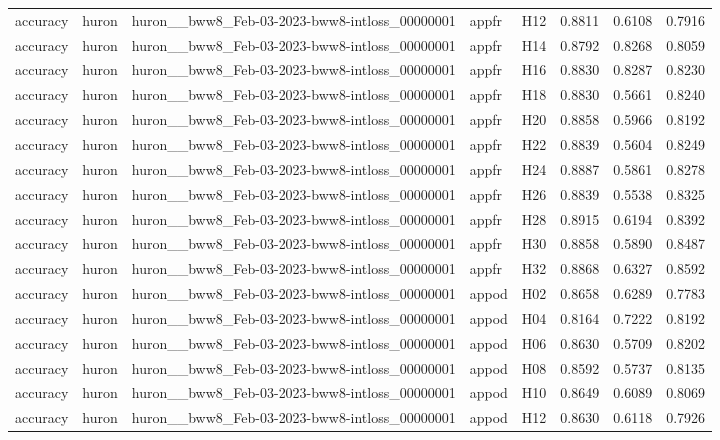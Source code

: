 \begin{table}[tbp]
\begin{tabular}{lllllrrr}
accuracy & huron & huron\_\_bww8\_Feb-03-2023-bww8-intloss\_00000001 & appfr & H12 & 0.8811 & 0.6108 & 0.7916 \\
accuracy & huron & huron\_\_bww8\_Feb-03-2023-bww8-intloss\_00000001 & appfr & H14 & 0.8792 & 0.8268 & 0.8059 \\
accuracy & huron & huron\_\_bww8\_Feb-03-2023-bww8-intloss\_00000001 & appfr & H16 & 0.8830 & 0.8287 & 0.8230 \\
accuracy & huron & huron\_\_bww8\_Feb-03-2023-bww8-intloss\_00000001 & appfr & H18 & 0.8830 & 0.5661 & 0.8240 \\
accuracy & huron & huron\_\_bww8\_Feb-03-2023-bww8-intloss\_00000001 & appfr & H20 & 0.8858 & 0.5966 & 0.8192 \\
accuracy & huron & huron\_\_bww8\_Feb-03-2023-bww8-intloss\_00000001 & appfr & H22 & 0.8839 & 0.5604 & 0.8249 \\
accuracy & huron & huron\_\_bww8\_Feb-03-2023-bww8-intloss\_00000001 & appfr & H24 & 0.8887 & 0.5861 & 0.8278 \\
accuracy & huron & huron\_\_bww8\_Feb-03-2023-bww8-intloss\_00000001 & appfr & H26 & 0.8839 & 0.5538 & 0.8325 \\
accuracy & huron & huron\_\_bww8\_Feb-03-2023-bww8-intloss\_00000001 & appfr & H28 & 0.8915 & 0.6194 & 0.8392 \\
accuracy & huron & huron\_\_bww8\_Feb-03-2023-bww8-intloss\_00000001 & appfr & H30 & 0.8858 & 0.5890 & 0.8487 \\
accuracy & huron & huron\_\_bww8\_Feb-03-2023-bww8-intloss\_00000001 & appfr & H32 & 0.8868 & 0.6327 & 0.8592 \\
accuracy & huron & huron\_\_bww8\_Feb-03-2023-bww8-intloss\_00000001 & appod & H02 & 0.8658 & 0.6289 & 0.7783 \\
accuracy & huron & huron\_\_bww8\_Feb-03-2023-bww8-intloss\_00000001 & appod & H04 & 0.8164 & 0.7222 & 0.8192 \\
accuracy & huron & huron\_\_bww8\_Feb-03-2023-bww8-intloss\_00000001 & appod & H06 & 0.8630 & 0.5709 & 0.8202 \\
accuracy & huron & huron\_\_bww8\_Feb-03-2023-bww8-intloss\_00000001 & appod & H08 & 0.8592 & 0.5737 & 0.8135 \\
accuracy & huron & huron\_\_bww8\_Feb-03-2023-bww8-intloss\_00000001 & appod & H10 & 0.8649 & 0.6089 & 0.8069 \\
accuracy & huron & huron\_\_bww8\_Feb-03-2023-bww8-intloss\_00000001 & appod & H12 & 0.8630 & 0.6118 & 0.7926 \\

\end{tabular}
\end{table}
